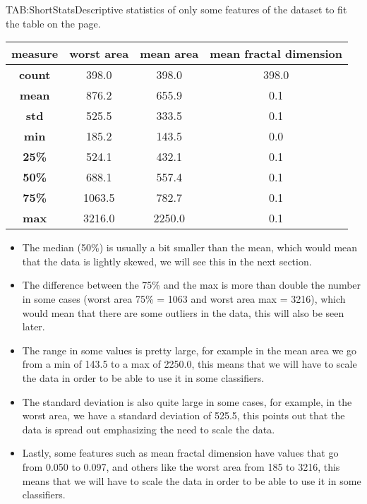 \begin{table}[short]{TAB:ShortStats}{Descriptive statistics of only some features of the dataset to fit the table on the page.}
    \begin{tabular}{|c|c|c|c|}
        \hline
        \textbf{measure} & \textbf{worst area} & \textbf{mean area} & \textbf{\bfseries mean fractal dimension} \\
        \hline\hline
        \textbf{count}   & 398.0               & 398.0              & 398.0                                     \\
        \hline
        \textbf{mean}    & 876.2               & 655.9              & 0.1                                       \\
        \hline
        \textbf{std}     & 525.5               & 333.5              & 0.1                                       \\
        \hline
        \textbf{min}     & 185.2               & 143.5              & 0.0                                       \\
        \hline
        \textbf{25\%}    & 524.1               & 432.1              & 0.1                                       \\
        \hline
        \textbf{50\%}    & 688.1               & 557.4              & 0.1                                       \\
        \hline
        \textbf{75\%}    & 1063.5              & 782.7              & 0.1                                       \\
        \hline
        \textbf{max}     & 3216.0              & 2250.0             & 0.1                                       \\
        \hline
    \end{tabular}
\end{table}

\begin{itemize}
    \item The median (50\%) is usually a bit smaller than the mean, which would mean that the data is lightly skewed, we will see this in the next section.
    \item The difference between the 75\% and the max is more than double the number in some cases (worst area 75\% = 1063 and worst area max = 3216), which would mean that there are some outliers in the data, this will also be seen later.
    \item The range in some values is pretty large, for example in the mean area we go from a min of 143.5 to a max of 2250.0, this means that we will have to scale the data in order to be able to use it in some classifiers.
    \item The standard deviation is also quite large in some cases, for example, in the worst area, we have a standard deviation of 525.5, this points out that the data is spread out emphasizing the need to scale the data.
    \item Lastly, some features such as mean fractal dimension have values that go from 0.050 to 0.097, and others like the worst area from 185 to 3216, this means that we will have to scale the data in order to be able to use it in some classifiers.
\end{itemize}

